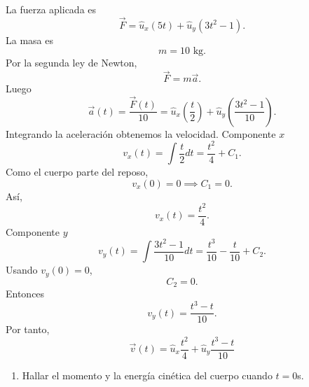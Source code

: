 \documentclass[12pt,a4paper]{article}
\newcommand{\paren}[1]{\left( #1 \right)}
\begin{document}
    \begin{solucion}
        La fuerza aplicada es
        \begin{equation*}
            \vec{F}=\hat{u}_{x}(5t)+\hat{u}_{y}(3t^{2}-1).
        \end{equation*}
        La masa es
        \begin{equation*}
            m=10\text{ kg}.
        \end{equation*}
        Por la segunda ley de Newton,
        \begin{equation*}
            \vec{F}=m\vec{a}.
        \end{equation*}
        Luego
        \begin{equation*}
            \vec{a}(t)=\frac{\vec{F}(t)}{10}=\hat{u}_{x}\paren{\frac{t}{2}}+\hat{u}_{y}\paren{\frac{3t^{2}-1}{10}}.
        \end{equation*}
        Integrando la aceleración obtenemos la velocidad. Componente $x$
        \begin{equation*}
            v_{x}(t)=\int\frac{t}{2}dt=\frac{t^{2}}{4}+C_{1}.
        \end{equation*}
        Como el cuerpo parte del reposo,
        \begin{equation*}
            v_{x}(0)=0\implies C_{1}=0.
        \end{equation*}
        Así,
        \begin{equation*}
            v_{x}(t)=\frac{t^{2}}{4}.
        \end{equation*}
        Componente $y$
        \begin{equation*}
            v_{y}(t)=\int\frac{3t^{2}-1}{10}dt=\frac{t^{3}}{10}-\frac{t}{10}+C_{2}.
        \end{equation*}
        Usando $v_{y}(0)=0$,
        \begin{equation*}
            C_{2}=0.
        \end{equation*}
        Entonces
        \begin{equation*}
            v_{y}(t)=\frac{t^{3}-t}{10}.
        \end{equation*}
        Por tanto,
        \begin{equation*}
            \vec{v}(t)=\hat{u}_{x}\frac{t^{2}}{4}+\hat{u}_{y}\frac{t^{3}-t}{10}
        \end{equation*}
        \begin{enumerate}
            \item[(a)] Hallar el momento y la energía cinética del cuerpo cuando $t=0$s.\\

\end{enumerate}
\end{solucion}
\end{document}

